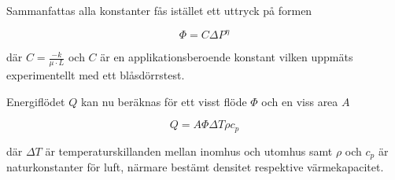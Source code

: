Sammanfattas alla konstanter fås istället ett uttryck på formen

\begin{equation}
\Phi = C\Delta P^\eta
\end{equation}

där $C=\frac{-k}{\mu \cdot L}$ och $C$ är en applikationsberoende konstant vilken uppmäts experimentellt med ett blåsdörrstest. 

Energiflödet $Q$ kan nu beräknas för ett visst flöde $\Phi$ och en viss area $A$

\begin{equation}
Q = A \Phi \Delta T \rho c_p
\end{equation}

där $\Delta T$ är temperaturskillanden mellan inomhus och utomhus samt $\rho$ och $c_p$ är naturkonstanter för luft, närmare bestämt densitet respektive värmekapacitet.


